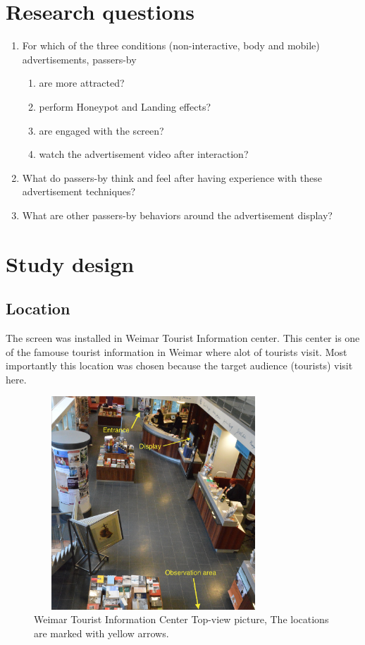 \section{Research questions}
\begin{enumerate}

\item	For which of the three conditions (non-interactive, body and mobile) advertisements, passers-by 

\begin{enumerate}
\item	are more attracted?
\item	perform Honeypot and Landing effects?
\item	are engaged with the screen?
\item	watch the advertisement video after interaction?
\end{enumerate}

\item   What do passers-by think and feel after having experience with these advertisement techniques?
\item   What are other passers-by behaviors around the advertisement display?
\end{enumerate}



\newpage
\section{Study design}


\subsection{Location}
The screen was installed in Weimar Tourist Information center. This center is one of the famouse tourist information in Weimar where alot of tourists visit. Most importantly this location was chosen because the target audience (tourists) visit here.

\begin{figure}[H]
    \centering
    \includegraphics[width =0.8\textwidth,height=8cm]{Figures/8/tourist_info}%
    \caption{Weimar Tourist Information Center Top-view picture, The locations are marked with yellow arrows.}%
    \label{fig:Tourist_info_center}%
\end{figure}


